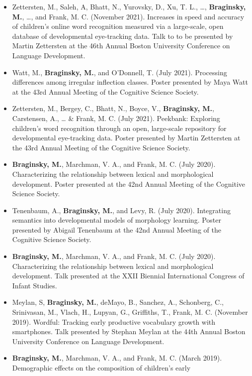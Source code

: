 \documentclass[11pt,]{article}
\begin{document}
\begin{itemize}
\item
  Zettersten, M., Saleh, A, Bhatt, N., Yurovsky, D., Xu, T. L., \ldots,
  \textbf{Braginsky, M.}, \ldots, and Frank, M. C. (November 2021).
  Increases in speed and accuracy of children's online word recognition
  measured via a large-scale, open database of developmental
  eye-tracking data. Talk to to be presented by Martin Zettersten at the
  46th Annual Boston University Conference on Language Development.
\item
  Watt, M., \textbf{Braginsky, M.}, and O'Donnell, T. (July 2021).
  Processing differences among irregular inflection classes. Poster
  presented by Maya Watt at the 43rd Annual Meeting of the Cognitive
  Science Society.
\item
  Zettersten, M., Bergey, C., Bhatt, N., Boyce, V., \textbf{Braginsky,
  M.}, Carstensen, A., \ldots{} \& Frank, M. C. (July 2021). Peekbank:
  Exploring children's word recognition through an open, large-scale
  repository for developmental eye-tracking data. Poster presented by
  Martin Zettersten at the 43rd Annual Meeting of the Cognitive Science
  Society.
\item
  \textbf{Braginsky, M.}, Marchman, V. A., and Frank, M. C. (July 2020).
  Characterizing the relationship between lexical and morphological
  development. Poster presented at the 42nd Annual Meeting of the
  Cognitive Science Society.
\item
  Tenenbaum, A., \textbf{Braginsky, M.}, and Levy, R. (July 2020).
  Integrating semantics into developmental models of morphology
  learning. Poster presented by Abigail Tenenbaum at the 42nd Annual
  Meeting of the Cognitive Science Society.
\item
  \textbf{Braginsky, M.}, Marchman, V. A., and Frank, M. C. (July 2020).
  Characterizing the relationship between lexical and morphological
  development. Talk presented at the XXII Biennial International
  Congress of Infant Studies.
\item
  Meylan, S, \textbf{Braginsky, M.}, deMayo, B., Sanchez, A., Schonberg,
  C., Srinivasan, M., Vlach, H., Lupyan, G., Griffiths, T., Frank, M. C.
  (November 2019). Wordful: Tracking early productive vocabulary growth
  with smartphones. Talk presented by Stephan Meylan at the 44th Annual
  Boston University Conference on Language Development.
\item
  \textbf{Braginsky, M.}, Marchman, V. A., and Frank, M. C. (March
  2019). Demographic effects on the composition of children's early

\end{itemize}
\end{document}
